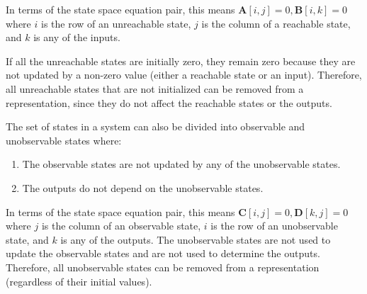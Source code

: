 In terms of the state space equation pair, this means $\mathbf{A}[i,j]
= 0, \mathbf{B}[i,k] = 0$ where $i$ is the row of an unreachable
state, $j$ is the column of a reachable state, and $k$ is any of the
inputs.

If all the unreachable states are initially zero, they remain zero
because they are not updated by a non-zero value (either a reachable
state or an input). Therefore, all unreachable states that are not
initialized can be removed from a representation, since they do not
affect the reachable states or the outputs.

The set of states in a system can also be divided into observable and
unobservable states where:
\begin{enumerate}
\vspace{\itemshrink} \item The observable states are not updated by any of the
unobservable states.

\vspace{\itemshrink} \item The outputs do not depend on the unobservable states.
\vspace{\itemshrink} \end{enumerate}

In terms of the state space equation pair, this means $\mathbf{C}[i,j]
= 0, \mathbf{D}[k,j] = 0$ where $j$ is the column of an observable
state, $i$ is the row of an unobservable state, and $k$ is any of the
outputs.  The unobservable states are not used to update the
observable states and are not used to determine the
outputs. Therefore, all unobservable states can be removed from a
representation (regardless of their initial values).

